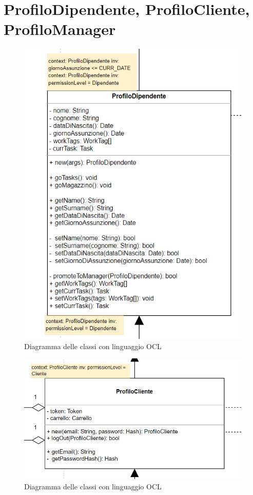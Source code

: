 \documentclass{report}
\begin{document}
\section{ProfiloDipendente, ProfiloCliente, ProfiloManager}
\begin{figure}[H]
	\centering\includegraphics[width=1\textwidth]{images/OCL/OCL_dipendente.png}
	Diagramma delle classi con linguaggio OCL 
\end{figure}
\begin{figure}[H]
	\centering\includegraphics[width=1\textwidth]{images/OCL/OCL_cliente.png}
	Diagramma delle classi con linguaggio OCL 
\end{figure}
\end{document}
